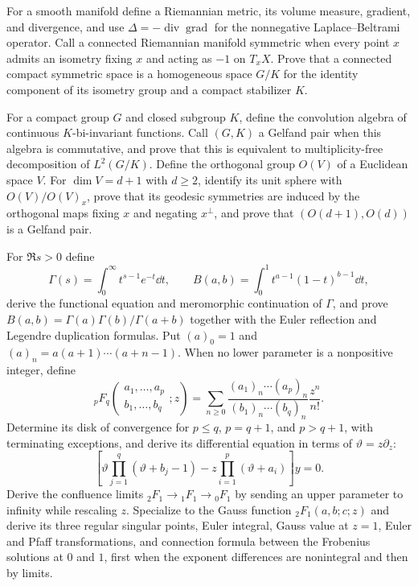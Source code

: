 \begin{exercise}
For a smooth manifold define a Riemannian metric, its volume measure,
gradient, and divergence, and use
$\Delta=-\operatorname{div}\operatorname{grad}$ for the nonnegative
Laplace--Beltrami operator.  Call a connected Riemannian manifold symmetric
when every point $x$ admits an isometry fixing $x$ and acting as $-1$ on
$T_xX$.  Prove that a connected compact symmetric space is a homogeneous
space $G/K$ for the identity component of its isometry group and a compact
stabilizer $K$.

For a compact group $G$ and closed subgroup $K$, define the convolution
algebra of continuous $K$-bi-invariant functions.  Call $(G,K)$ a Gelfand
pair when this algebra is commutative, and prove that this is equivalent to
multiplicity-free decomposition of $L^2(G/K)$.  Define the orthogonal group
$O(V)$ of a Euclidean space $V$.  For $\dim V=d+1$ with $d\geq2$, identify
its unit sphere with $O(V)/O(V)_x$, prove that its geodesic symmetries are induced by the
orthogonal maps fixing $x$ and negating $x^\perp$, and prove that
$(O(d+1),O(d))$ is a Gelfand pair.
\end{exercise}

\begin{exercise}
For $\Re s>0$ define
\[
 \Gamma(s)=\int_0^\infty t^{s-1}e^{-t}\dd t,
 \qquad
 B(a,b)=\int_0^1t^{a-1}(1-t)^{b-1}\dd t,
\]
derive the functional equation and meromorphic continuation of $\Gamma$, and
prove $B(a,b)=\Gamma(a)\Gamma(b)/\Gamma(a+b)$ together with the Euler
reflection and Legendre duplication formulas.  Put
$(a)_0=1$ and $(a)_n=a(a+1)\cdots(a+n-1)$.  When no lower parameter is a
nonpositive integer, define
\[
 {}_pF_q\!\left(\begin{matrix}a_1,\ldots,a_p\\b_1,\ldots,b_q\end{matrix};z\right)
 =\sum_{n\geq0}\frac{(a_1)_n\cdots(a_p)_n}
 {(b_1)_n\cdots(b_q)_n}\frac{z^n}{n!}.
\]
Determine its disk of convergence for $p\leq q$, $p=q+1$, and $p>q+1$, with
terminating exceptions, and derive its differential equation in terms of
$\vartheta=z\partial_z$:
\[
 \left[\vartheta\prod_{j=1}^q(\vartheta+b_j-1)
 -z\prod_{i=1}^p(\vartheta+a_i)\right]y=0.
\]
Derive the confluence limits ${}_2F_1\to{}_1F_1\to{}_0F_1$ by sending an
upper parameter to infinity while rescaling $z$.  Specialize to the Gauss
function ${}_2F_1(a,b;c;z)$ and
derive its three regular singular points, Euler integral, Gauss value at
$z=1$, Euler and Pfaff transformations, and connection formula between the
Frobenius solutions at $0$ and $1$, first when the exponent differences are
nonintegral and then by limits.
\end{exercise}

